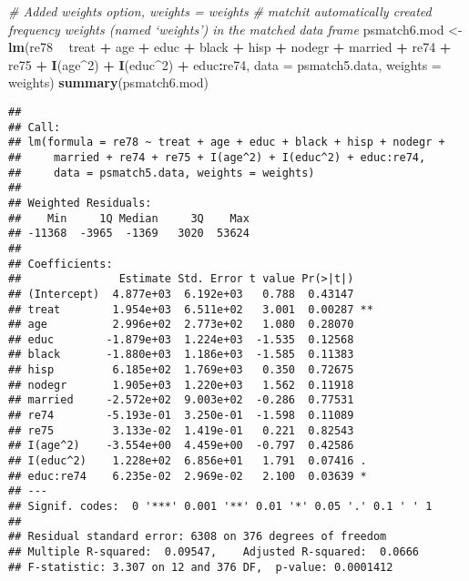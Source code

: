 \documentclass[]{article}
\newenvironment{Shaded}{\begin{snugshade}}{\end{snugshade}}
\newcommand{\CommentTok}[1]{\textcolor[rgb]{0.56,0.35,0.01}{\textit{#1}}}
\newcommand{\DataTypeTok}[1]{\textcolor[rgb]{0.13,0.29,0.53}{#1}}
\newcommand{\DecValTok}[1]{\textcolor[rgb]{0.00,0.00,0.81}{#1}}
\newcommand{\KeywordTok}[1]{\textcolor[rgb]{0.13,0.29,0.53}{\textbf{#1}}}
\newcommand{\NormalTok}[1]{#1}
\newcommand{\OperatorTok}[1]{\textcolor[rgb]{0.81,0.36,0.00}{\textbf{#1}}}
\newcommand{\StringTok}[1]{\textcolor[rgb]{0.31,0.60,0.02}{#1}}
\begin{document}
\begin{Shaded}
\begin{Highlighting}[]
\CommentTok{# Added weights option, weights = weights}
\CommentTok{# matchit automatically created frequency weights (named `weights') in the matched data frame}
\NormalTok{psmatch6.mod <-}\StringTok{ }\KeywordTok{lm}\NormalTok{(re78 }\OperatorTok{~}\StringTok{ }\NormalTok{treat }\OperatorTok{+}\StringTok{ }\NormalTok{age }\OperatorTok{+}\StringTok{ }\NormalTok{educ }\OperatorTok{+}\StringTok{ }\NormalTok{black }\OperatorTok{+}\StringTok{ }\NormalTok{hisp }\OperatorTok{+}\StringTok{ }\NormalTok{nodegr }\OperatorTok{+}\StringTok{ }\NormalTok{married }\OperatorTok{+}\StringTok{ }\NormalTok{re74 }\OperatorTok{+}\StringTok{ }\NormalTok{re75 }\OperatorTok{+}\StringTok{ }
\StringTok{                     }\KeywordTok{I}\NormalTok{(age}\OperatorTok{^}\DecValTok{2}\NormalTok{) }\OperatorTok{+}\StringTok{ }\KeywordTok{I}\NormalTok{(educ}\OperatorTok{^}\DecValTok{2}\NormalTok{) }\OperatorTok{+}\StringTok{ }\NormalTok{educ}\OperatorTok{:}\NormalTok{re74, }
                   \DataTypeTok{data =}\NormalTok{ psmatch5.data, }\DataTypeTok{weights =}\NormalTok{ weights)}
\KeywordTok{summary}\NormalTok{(psmatch6.mod)}
\end{Highlighting}
\end{Shaded}

\begin{verbatim}
## 
## Call:
## lm(formula = re78 ~ treat + age + educ + black + hisp + nodegr + 
##     married + re74 + re75 + I(age^2) + I(educ^2) + educ:re74, 
##     data = psmatch5.data, weights = weights)
## 
## Weighted Residuals:
##    Min     1Q Median     3Q    Max 
## -11368  -3965  -1369   3020  53624 
## 
## Coefficients:
##               Estimate Std. Error t value Pr(>|t|)   
## (Intercept)  4.877e+03  6.192e+03   0.788  0.43147   
## treat        1.954e+03  6.511e+02   3.001  0.00287 **
## age          2.996e+02  2.773e+02   1.080  0.28070   
## educ        -1.879e+03  1.224e+03  -1.535  0.12568   
## black       -1.880e+03  1.186e+03  -1.585  0.11383   
## hisp         6.185e+02  1.769e+03   0.350  0.72675   
## nodegr       1.905e+03  1.220e+03   1.562  0.11918   
## married     -2.572e+02  9.003e+02  -0.286  0.77531   
## re74        -5.193e-01  3.250e-01  -1.598  0.11089   
## re75         3.133e-02  1.419e-01   0.221  0.82543   
## I(age^2)    -3.554e+00  4.459e+00  -0.797  0.42586   
## I(educ^2)    1.228e+02  6.856e+01   1.791  0.07416 . 
## educ:re74    6.235e-02  2.969e-02   2.100  0.03639 * 
## ---
## Signif. codes:  0 '***' 0.001 '**' 0.01 '*' 0.05 '.' 0.1 ' ' 1
## 
## Residual standard error: 6308 on 376 degrees of freedom
## Multiple R-squared:  0.09547,    Adjusted R-squared:  0.0666 
## F-statistic: 3.307 on 12 and 376 DF,  p-value: 0.0001412
\end{verbatim}
\end{document}
